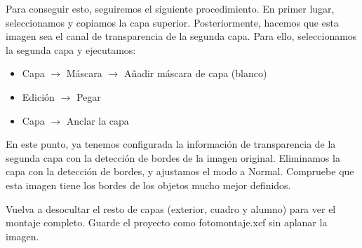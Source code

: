 \documentclass[es,practica]{uah}
\begin{document}
Para conseguir esto, seguiremos el siguiente procedimiento. En primer lugar, seleccionamos y copiamos la capa superior. Posteriormente, hacemos que esta imagen sea el canal de transparencia de la segunda capa. Para ello, seleccionamos la segunda capa y ejecutamos:

\begin{itemize}
	\item Capa $\rightarrow$ Máscara $\rightarrow$ Añadir máscara de capa (blanco)
	\item Edición $\rightarrow$ Pegar
	\item Capa $\rightarrow$ Anclar la capa
\end{itemize}


En este punto, ya tenemos configurada la información de transparencia de la segunda capa con la detección de bordes de la imagen original. Eliminamos la capa con la detección de bordes, y ajustamos el modo a Normal. Compruebe que esta imagen tiene los bordes de los objetos mucho mejor definidos.

Vuelva a desocultar el resto de capas (exterior, cuadro y alumno) para ver el montaje completo. Guarde el proyecto como fotomontaje.xcf sin aplanar la imagen.
\end{document}

